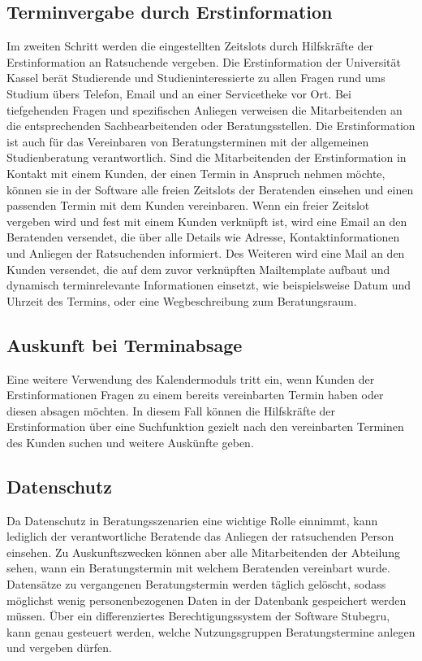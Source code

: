 \subsection*{Terminvergabe durch Erstinformation}
Im zweiten Schritt werden die eingestellten Zeitslots durch Hilfskräfte der
Erstinformation an Ratsuchende vergeben. Die Erstinformation der Universität
Kassel berät Studierende und Studieninteressierte zu allen Fragen rund ums
Studium übers Telefon, Email und an einer Servicetheke vor Ort. Bei
tiefgehenden Fragen und spezifischen Anliegen verweisen die Mitarbeitenden an
die entsprechenden Sachbearbeitenden oder Beratungsstellen. Die Erstinformation
ist auch für das Vereinbaren von Beratungsterminen mit der allgemeinen
Studienberatung verantwortlich. Sind die Mitarbeitenden der Erstinformation in
Kontakt mit einem Kunden, der einen Termin in Anspruch nehmen möchte, können
sie in der Software alle freien Zeitslots der Beratenden einsehen und einen
passenden Termin mit dem Kunden vereinbaren. Wenn ein freier Zeitslot vergeben
wird und fest mit einem Kunden verknüpft ist, wird eine Email an den Beratenden
versendet, die über alle Details wie Adresse, Kontaktinformationen und Anliegen
der Ratsuchenden informiert. Des Weiteren wird eine Mail an den Kunden
versendet, die auf dem zuvor verknüpften Mailtemplate aufbaut und dynamisch
terminrelevante Informationen einsetzt, wie beispielsweise Datum und Uhrzeit
des Termins, oder eine Wegbeschreibung zum Beratungsraum.

\subsection*{Auskunft bei Terminabsage}
Eine weitere Verwendung des Kalendermoduls tritt ein, wenn Kunden der
Erstinformationen Fragen zu einem bereits vereinbarten Termin haben oder diesen
absagen möchten. In diesem Fall können die Hilfskräfte der Erstinformation über
eine Suchfunktion gezielt nach den vereinbarten Terminen des Kunden suchen und
weitere Auskünfte geben.

\subsection*{Datenschutz}
Da Datenschutz in Beratungsszenarien eine wichtige Rolle einnimmt, kann
lediglich der verantwortliche Beratende das Anliegen der ratsuchenden Person
einsehen. Zu Auskunftszwecken können aber alle Mitarbeitenden der Abteilung
sehen, wann ein Beratungstermin mit welchem Beratenden vereinbart wurde.
Datensätze zu vergangenen Beratungstermin werden täglich gelöscht, sodass
möglichst wenig personenbezogenen Daten in der Datenbank gespeichert werden
müssen. Über ein differenziertes Berechtigungssystem der Software Stubegru,
kann genau gesteuert werden, welche Nutzungsgruppen Beratungstermine anlegen
und vergeben dürfen.

